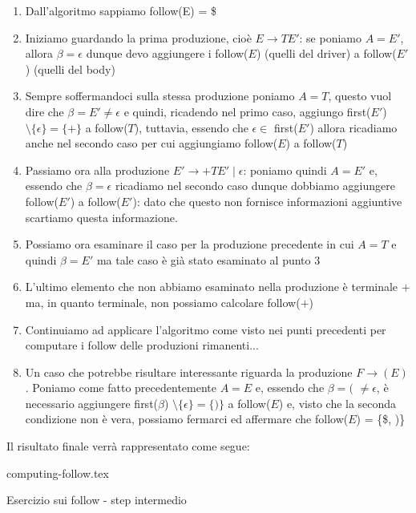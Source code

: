 \documentclass[class=book, crop=false, oneside, 12pt]{standalone}
\begin{document}
\begin{enumerate}
    \item Dall'algoritmo sappiamo follow(E) = \$
    \item Iniziamo guardando la prima produzione, cioè \(E \rightarrow TE'\): se poniamo \(A = E'\), allora \(\beta = \epsilon\) dunque devo aggiungere i follow(\(E\)) (quelli del driver) a follow(\(E'\)) (quelli del body)
    \item Sempre soffermandoci sulla stessa produzione poniamo \(A = T\), questo vuol dire che \(\beta = E' \neq \epsilon\) e quindi, ricadendo nel primo caso, aggiungo first(\(E'\)) \(\setminus \{\epsilon\} = \{+\}\) a follow(\(T\)), tuttavia, essendo che \(\epsilon \in\) first(\(E'\)) allora ricadiamo anche nel secondo caso per cui aggiungiamo follow(\(E\)) a follow(\(T\))
    \item Passiamo ora alla produzione \(E' \rightarrow +TE' \mid \epsilon\): poniamo quindi \(A = E'\) e, essendo che \(\beta = \epsilon\) ricadiamo nel secondo caso dunque dobbiamo aggiungere follow(\(E'\)) a follow(\(E'\)): dato che questo non fornisce informazioni aggiuntive scartiamo questa informazione.
    \item Possiamo ora esaminare il caso per la produzione precedente in cui \(A = T\) e quindi \(\beta = E'\) ma tale caso è già stato esaminato al punto 3
    \item L'ultimo elemento che non abbiamo esaminato nella produzione è terminale \(+\) ma, in quanto terminale, non possiamo calcolare follow(\(+\))
    \item Continuiamo ad applicare l'algoritmo come visto nei punti precedenti per computare i follow delle produzioni rimanenti...
    \item Un caso che potrebbe risultare interessante riguarda la produzione \(F \rightarrow (E)\). Poniamo come fatto precedentemente \(A = E\) e, essendo che \(\beta = (\) \(\neq \epsilon\), è necessario aggiungere first(\(\beta\)) \(\setminus \{\epsilon\} = \{)\}\) a follow(\(E\)) e, visto che la seconda condizione non è vera, possiamo fermarci ed affermare che follow(\(E\)) = \{\$, )\}
\end{enumerate}

Il risultato finale verrà rappresentato come segue:

\begin{table}[H]
	\centering
	{computing-follow.tex}
    \caption{Esercizio sui follow - step intermedio}
    \label{computing-follow}
\end{table}
\end{document}
